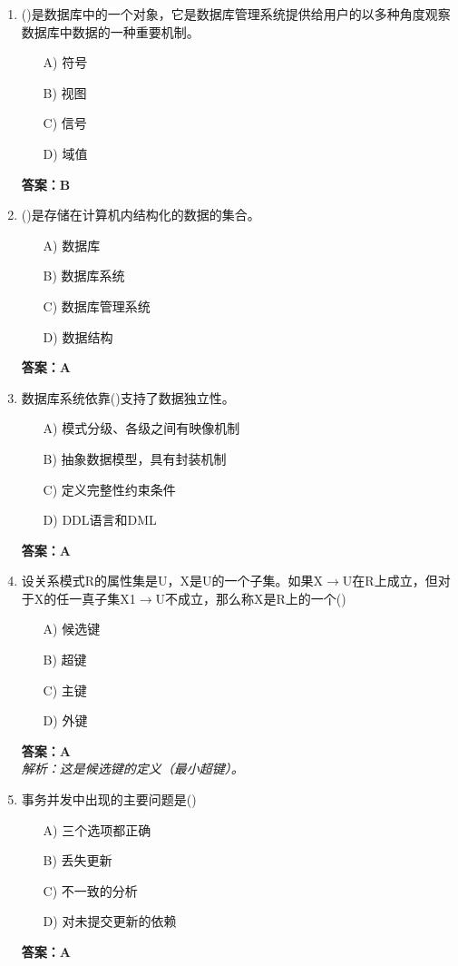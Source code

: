 \documentclass[a4paper,12pt]{article}
\begin{document}
\begin{enumerate}[label=\arabic*.]
\item ()是数据库中的一个对象，它是数据库管理系统提供给用户的以多种角度观察数据库中数据的一种重要机制。
\begin{itemize}
    \item[A)] 符号
    \item[B)] 视图
    \item[C)] 信号
    \item[D)] 域值
\end{itemize}
\textbf{答案：B}

\item ()是存储在计算机内结构化的数据的集合。
\begin{itemize}
    \item[A)] 数据库
    \item[B)] 数据库系统
    \item[C)] 数据库管理系统
    \item[D)] 数据结构
\end{itemize}
\textbf{答案：A}

\item 数据库系统依靠()支持了数据独立性。
\begin{itemize}
    \item[A)] 模式分级、各级之间有映像机制
    \item[B)] 抽象数据模型，具有封装机制
    \item[C)] 定义完整性约束条件
    \item[D)] DDL语言和DML
\end{itemize}
\textbf{答案：A}

\item 设关系模式R的属性集是U，X是U的一个子集。如果X$\to$U在R上成立，但对于X的任一真子集X1$\to$U不成立，那么称X是R上的一个()
\begin{itemize}
    \item[A)] 候选键
    \item[B)] 超键
    \item[C)] 主键
    \item[D)] 外键
\end{itemize}
\textbf{答案：A} \\
\textit{解析：这是候选键的定义（最小超键）。}

\item 事务并发中出现的主要问题是()
\begin{itemize}
    \item[A)] 三个选项都正确
    \item[B)] 丢失更新
    \item[C)] 不一致的分析
    \item[D)] 对未提交更新的依赖
\end{itemize}
\textbf{答案：A}


\end{enumerate}
\end{document}
